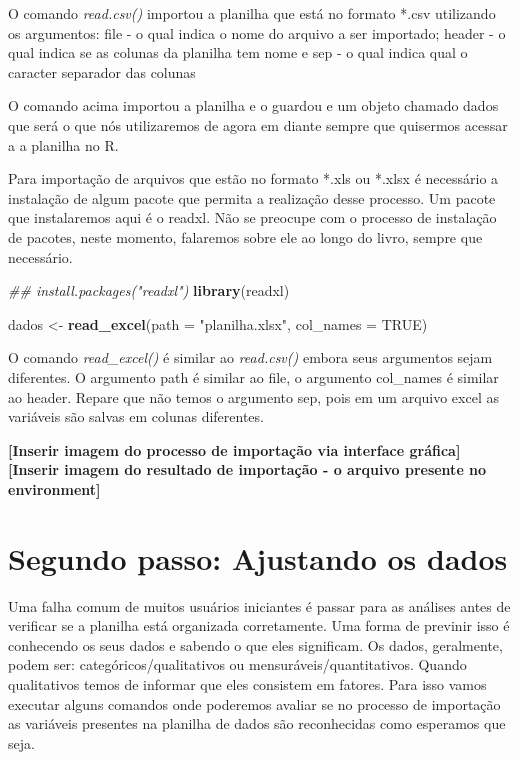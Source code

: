 \documentclass[]{book}
\newenvironment{Shaded}{\begin{snugshade}}{\end{snugshade}}
\newcommand{\CommentTok}[1]{\textcolor[rgb]{0.56,0.35,0.01}{\textit{#1}}}
\newcommand{\DataTypeTok}[1]{\textcolor[rgb]{0.13,0.29,0.53}{#1}}
\newcommand{\KeywordTok}[1]{\textcolor[rgb]{0.13,0.29,0.53}{\textbf{#1}}}
\newcommand{\NormalTok}[1]{#1}
\newcommand{\OtherTok}[1]{\textcolor[rgb]{0.56,0.35,0.01}{#1}}
\newcommand{\StringTok}[1]{\textcolor[rgb]{0.31,0.60,0.02}{#1}}
\begin{document}
O comando \emph{read.csv()} importou a planilha que está no formato *.csv utilizando os argumentos: file - o qual indica o nome do arquivo a ser importado; header - o qual indica se as colunas da planilha tem nome e sep - o qual indica qual o caracter separador das colunas

O comando acima importou a planilha e o guardou e um objeto chamado dados que será o que nós utilizaremos de agora em diante sempre que quisermos acessar a a planilha no R.

Para importação de arquivos que estão no formato *.xls ou *.xlsx é necessário a instalação de algum pacote que permita a realização desse processo. Um pacote que instalaremos aqui é o readxl. Não se preocupe com o processo de instalação de pacotes, neste momento, falaremos sobre ele ao longo do livro, sempre que necessário.

\begin{Shaded}
\begin{Highlighting}[]
\CommentTok{## install.packages("readxl")}
\KeywordTok{library}\NormalTok{(readxl)}
\end{Highlighting}
\end{Shaded}

\begin{Shaded}
\begin{Highlighting}[]
\NormalTok{dados <-}\StringTok{ }\KeywordTok{read_excel}\NormalTok{(}\DataTypeTok{path =} \StringTok{"planilha.xlsx"}\NormalTok{, }\DataTypeTok{col_names =} \OtherTok{TRUE}\NormalTok{)}
\end{Highlighting}
\end{Shaded}

O comando \emph{read\_excel()} é similar ao \emph{read.csv()} embora seus argumentos sejam diferentes. O argumento path é similar ao file, o argumento col\_names é similar ao header. Repare que não temos o argumento sep, pois em um arquivo excel as variáveis são salvas em colunas diferentes.

\textbf{{[}Inserir imagem do processo de importação via interface gráfica{]}}
\textbf{{[}Inserir imagem do resultado de importação - o arquivo presente no environment{]}}

\hypertarget{segundo-passo-ajustando-os-dados}{%
\section{Segundo passo: Ajustando os dados}\label{segundo-passo-ajustando-os-dados}}

Uma falha comum de muitos usuários iniciantes é passar para as análises antes de verificar se a planilha está organizada corretamente. Uma forma de previnir isso é conhecendo os seus dados e sabendo o que eles significam. Os dados, geralmente, podem ser: categóricos/qualitativos ou mensuráveis/quantitativos. Quando qualitativos temos de informar que eles consistem em fatores. Para isso vamos executar alguns comandos onde poderemos avaliar se no processo de importação as variáveis presentes na planilha de dados são reconhecidas como esperamos que seja.
\end{document}
